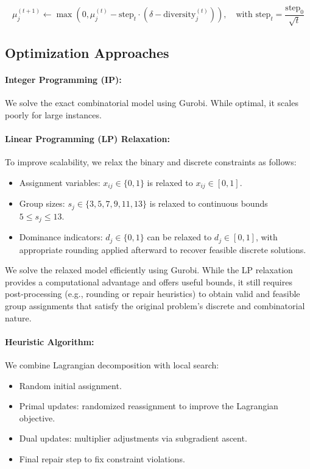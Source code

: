 \[
\mu_j^{(t+1)} \leftarrow \max(0, \mu_j^{(t)} - \text{step}_t \cdot (\delta - \text{diversity}_j^{(t)})), \quad \text{with } \text{step}_t = \frac{\text{step}_0}{\sqrt{t}}
\]

\subsection*{Optimization Approaches}

\paragraph{Integer Programming (IP):}
We solve the exact combinatorial model using Gurobi. While optimal, it scales poorly for large instances.

\paragraph{Linear Programming (LP) Relaxation:}
To improve scalability, we relax the binary and discrete constraints as follows:  
\begin{itemize}  
    \item Assignment variables: \( x_{ij} \in \{0, 1\} \) is relaxed to \( x_{ij} \in [0, 1] \).  
    \item Group sizes: \( s_j \in \{3, 5, 7, 9, 11, 13\} \) is relaxed to continuous bounds \( 5 \leq s_j \leq 13 \).  
    \item Dominance indicators: \( d_j \in \{0, 1\} \) can be relaxed to \( d_j \in [0, 1] \), with appropriate rounding applied afterward to recover feasible discrete solutions.  
\end{itemize}  
We solve the relaxed model efficiently using Gurobi. While the LP relaxation provides a computational advantage and offers useful bounds, it still requires post-processing (e.g., rounding or repair heuristics) to obtain valid and feasible group assignments that satisfy the original problem’s discrete and combinatorial nature.

\paragraph{Heuristic Algorithm:}
We combine Lagrangian decomposition with local search:
\begin{itemize}
    \item Random initial assignment.
    \item Primal updates: randomized reassignment to improve the Lagrangian objective.
    \item Dual updates: multiplier adjustments via subgradient ascent.
    \item Final repair step to fix constraint violations.
\end{itemize}

